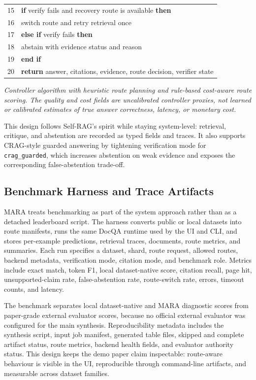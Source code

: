 \begin{center}
{\begin{minipage}{0.94\linewidth}
\begin{tabularx}{\linewidth}{@{}r@{\quad}X@{}}
15 & \textbf{if} verify fails and recovery route is available \textbf{then} \\
16 & \hspace*{1em} switch route and retry retrieval once \\
17 & \textbf{else if} verify fails \textbf{then} \\
18 & \hspace*{1em} abstain with evidence status and reason \\
19 & \textbf{end if} \\
20 & \textbf{return} answer, citations, evidence, route decision, verifier state \\
\end{tabularx}
\vspace{0.5mm}

\emph{Controller algorithm with heuristic route planning and rule-based cost-aware route scoring. The quality and cost fields are uncalibrated controller proxies, not learned or calibrated estimates of true answer correctness, latency, or monetary cost.}
\end{minipage}}
\end{center}

This design follows Self-RAG's spirit while staying system-level: retrieval, critique, and abstention are recorded as typed fields and traces. It also supports CRAG-style guarded answering by tightening verification mode for \texttt{crag\_guarded}, which increases abstention on weak evidence and exposes the corresponding false-abstention trade-off.

\subsection{Benchmark Harness and Trace Artifacts}

MARA treats benchmarking as part of the system approach rather than as a detached leaderboard script. The harness converts public or local datasets into route manifests, runs the same DocQA runtime used by the UI and CLI, and stores per-example predictions, retrieval traces, documents, route metrics, and summaries. Each run specifies a dataset, shard, route request, allowed routes, backend metadata, verification mode, citation mode, and benchmark role. Metrics include exact match, token F1, local dataset-native score, citation recall, page hit, unsupported-claim rate, false-abstention rate, route-switch rate, errors, timeout counts, and latency.

The benchmark separates local dataset-native and MARA diagnostic scores from paper-grade external evaluator scores, because no official external evaluator was configured for the main synthesis. Reproducibility metadata includes the synthesis script, input job manifest, generated table files, skipped and complete artifact status, route metrics, backend health fields, and evaluator authority status. This design keeps the demo paper claim inspectable: route-aware behaviour is visible in the UI, reproducible through command-line artifacts, and measurable across dataset families.

